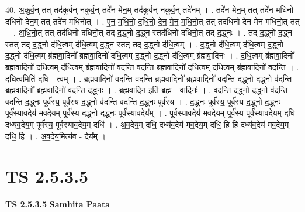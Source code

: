 \documentclass[17pt]{extarticle}
\begin{document}
40. अ॒कु॒र्व॒न् तत् तद॑कुर्वन् नकुर्व॒न् तदे॑न मेन॒म् तद॑कुर्वन् नकुर्व॒न् तदे॑नम् । . तदे॑न मेन॒म् तत् तदे॑न मधिनो दधिनो देन॒म् तत् तदे॑न मधिनोत् । . ए॒न॒ म॒धि॒नो॒ द॒धि॒नो॒ दे॒न॒ मे॒न॒ म॒धि॒नो॒त् तत् तद॑धिनो देन मेन मधिनो॒त् तत् । . अ॒धि॒नो॒त् तत् तद॑धिनो दधिनो॒त् तद् द॒द्ध्नो द॒द्ध्न स्तद॑धिनो दधिनो॒त् तद् द॒द्ध्नः । . तद् द॒द्ध्नो द॒द्ध्न स्तत् तद् द॒द्ध्नो द॑धि॒त्वम् द॑धि॒त्वम् द॒द्ध्न स्तत् तद् द॒द्ध्नो द॑धि॒त्वम् । . द॒द्ध्नो द॑धि॒त्वम् द॑धि॒त्वम् द॒द्ध्नो द॒द्ध्नो द॑धि॒त्वम् ब्र॑ह्मवा॒दिनो᳚ ब्रह्मवा॒दिनो॑ दधि॒त्वम् द॒द्ध्नो द॒द्ध्नो द॑धि॒त्वम् ब्र॑ह्मवा॒दिनः॑ । . द॒धि॒त्वम् ब्र॑ह्मवा॒दिनो᳚ ब्रह्मवा॒दिनो॑ दधि॒त्वम् द॑धि॒त्वम् ब्र॑ह्मवा॒दिनो॑ वदन्ति वदन्ति ब्रह्मवा॒दिनो॑ दधि॒त्वम् द॑धि॒त्वम् ब्र॑ह्मवा॒दिनो॑ वदन्ति । . द॒धि॒त्वमिति॑ दधि - त्वम् । . ब्र॒ह्म॒वा॒दिनो॑ वदन्ति वदन्ति ब्रह्मवा॒दिनो᳚ ब्रह्मवा॒दिनो॑ वदन्ति द॒द्ध्नो द॒द्ध्नो व॑दन्ति ब्रह्मवा॒दिनो᳚ ब्रह्मवा॒दिनो॑ वदन्ति द॒द्ध्नः । . ब्र॒ह्म॒वा॒दिन॒ इति॑ ब्रह्म - वा॒दिनः॑ । . व॒द॒न्ति॒ द॒द्ध्नो द॒द्ध्नो व॑दन्ति वदन्ति द॒द्ध्नः पूर्व॑स्य॒ पूर्व॑स्य द॒द्ध्नो व॑दन्ति वदन्ति द॒द्ध्नः पूर्व॑स्य । . द॒द्ध्नः पूर्व॑स्य॒ पूर्व॑स्य द॒द्ध्नो द॒द्ध्नः पूर्व॑स्याव॒देय॑ मव॒देय॒म् पूर्व॑स्य द॒द्ध्नो द॒द्ध्नः पूर्व॑स्याव॒देय᳚म् । . पूर्व॑स्याव॒देय॑ मव॒देय॒म् पूर्व॑स्य॒ पूर्व॑स्याव॒देय॒म् दधि॒ दध्य॑व॒देय॒म् पूर्व॑स्य॒ पूर्व॑स्याव॒देय॒म् दधि॑ । . अ॒व॒देय॒म् दधि॒ दध्य॑व॒देय॑ मव॒देय॒म् दधि॒ हि हि दध्य॑व॒देय॑ मव॒देय॒म् दधि॒ हि । . अ॒व॒देय॒मित्य॑व - देय᳚म् । \newline
\pagebreak
{}

\section{ TS 2.5.3.5 }

\textbf{TS 2.5.3.5 } \newline
\textbf{Samhita Paata} \newline
\end{document}
